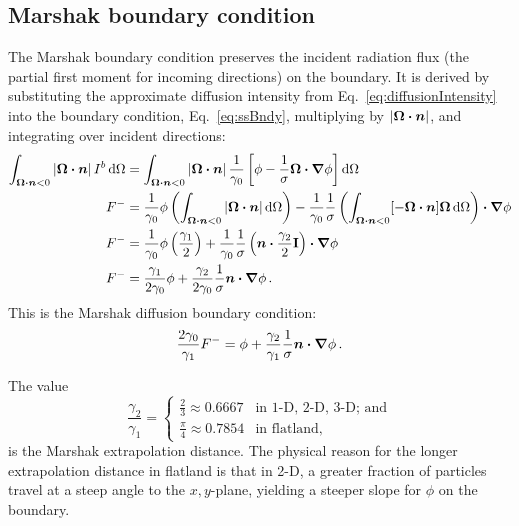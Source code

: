 \subsection{Marshak boundary condition}
The Marshak boundary condition \cite{Mar1947} preserves the incident radiation
flux (the partial first moment for incoming directions) on the boundary. It is
derived by substituting the approximate diffusion
intensity from Eq.~\eqref{eq:diffusionIntensity} into the boundary condition,
Eq.~\eqref{eq:ssBndy}, multiplying by $\left| \bm{\Omega}\bm{\cdot} \bm{n} \right|$, and integrating over
incident directions:
\begin{align*}
\int_{\bm{\Omega}\bm{\cdot} \bm{n} < 0 } \left| \bm{\Omega}\bm{\cdot} \bm{n} \right|
I^b \mathop{}\!\mathrm{d}\Omega
 &= 
\int_{\bm{\Omega}\bm{\cdot} \bm{n} < 0 } \left| \bm{\Omega}\bm{\cdot} \bm{n} \right| 
 \frac{1}{\gamma_0} \left[ \phi - \frac{1}{\sigma}
  \bm{\Omega} \bm{\cdot} \bm{\nabla} \phi \right]
  \mathop{}\!\mathrm{d}\Omega
\\
F^{-}
&= 
\frac{1}{\gamma_0} \phi \left( \int_{\bm{\Omega}\bm{\cdot} \bm{n} < 0 }
\left| \bm{\Omega}\bm{\cdot} \bm{n} \right| \mathop{}\!\mathrm{d}\Omega \right) 
  - \frac{1}{\gamma_0}\frac{1}{\sigma}
  \left( \int_{\bm{\Omega}\bm{\cdot} \bm{n} < 0 } [-\bm{\Omega}\bm{\cdot} \bm{n}]
  \bm{\Omega} \mathop{}\!\mathrm{d}\Omega  \right) \bm{\cdot} \bm{\nabla} \phi
\\
F^{-}
&=
\frac{1}{\gamma_0} \phi \left( \frac{\gamma_1}{2} \right) 
  + \frac{1}{\gamma_0}\frac{1}{\sigma} \left( \bm{n} \bm{\cdot}
  \frac{\gamma_2}{2} \mathbf{I} \right)
  \bm{\cdot} \bm{\nabla} \phi
\\
F^{-}
&=
\frac{\gamma_1}{2\gamma_0} \phi
+ \frac{\gamma_2}{2\gamma_0}\frac{1}{\sigma} \bm{n} \bm{\cdot} \bm{\nabla} \phi\,.
\end{align*}
This is the Marshak diffusion boundary condition:
\begin{equation} \label{eq:marshak}
\frac{2\gamma_0}{\gamma_1} F^{-}
=
\phi + \frac{\gamma_2}{\gamma_1}\frac{1}{\sigma} \bm{n} \bm{\cdot} \bm{\nabla} \phi\,.
\end{equation}

The value
\begin{equation*}
  \frac{\gamma_2}{\gamma_1}
  =
  \begin{cases}
    \frac{2}{3} \approx 0.6667 & \text{in 1-D, 2-D, 3-D; and} \\
    \frac{\pi}{4} \approx 0.7854 & \text{in flatland,}
  \end{cases}
\end{equation*}
is the Marshak extrapolation distance.
The physical reason for the longer extrapolation distance in flatland
is that in 2-D, a greater fraction of particles travel at a steep angle to the
$x,y$-plane, yielding a steeper slope for $\phi$ on the boundary.

